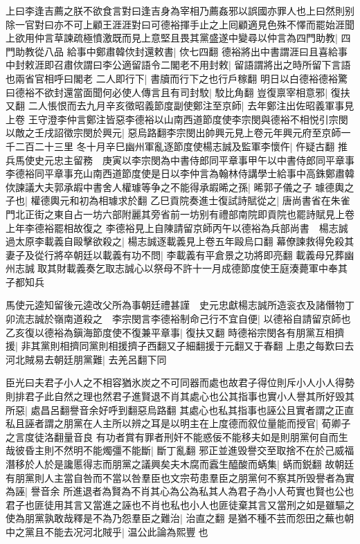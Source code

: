 上曰李逢吉薦之朕不欲食言對曰逢吉身為宰相乃薦姦邪以誤國亦罪人也上曰然則别除一官對曰亦不可上顧王涯涯對曰可德裕揮手止之上囘顧適見色殊不懌而罷始涯聞上欲用仲言草諫疏極憤激既而見上意堅且畏其黨盛遂中變尋以仲言為四門助教|{
	四門助教從八品}
給事中鄭肅韓佽封還敕書|{
	佽七四翻}
德裕將出中書謂涯曰且喜給事中封敕涯即召肅佽謂曰李公適留語令二閣老不用封敕|{
	留語謂將出之時所留下言語也兩省官相呼曰閣老}
二人即行下|{
	書牘而行下之也行戶稼翻}
明日以白德裕德裕驚曰德裕不欲封還當面聞何必使人傳言且有司封駮|{
	駮比角翻}
豈復禀宰相意邪|{
	復扶又翻}
二人悵恨而去九月辛亥徵昭義節度副使鄭注至京師|{
	去年鄭注出佐昭義軍事見上卷}
王守澄李仲言鄭注皆惡李德裕以山南西道節度使李宗閔與德裕不相悦引宗閔以敵之壬戌詔徵宗閔於興元|{
	惡烏路翻李宗閔出帥興元見上卷元年興元府至京師一千二百二十三里}
冬十月辛巳幽州軍亂逐節度使楊志誠及監軍李懷仵|{
	仵疑古翻}
推兵馬使史元忠主留務　庚寅以李宗閔為中書侍郎同平章事甲午以中書侍郎同平章事李德裕同平章事充山南西道節度使是日以李仲言為翰林侍講學士給事中高銖鄭肅韓佽諫議大夫郭承嘏中書舍人權璩等争之不能得承嘏晞之孫|{
	晞郭子儀之子}
璩德輿之子也|{
	權德輿元和初為相璩求於翻}
乙巳貢院奏進士復試詩賦從之|{
	唐尚書省在朱雀門北正街之東自占一坊六部附麗其旁省前一坊别有禮部南院即貢院也罷詩賦見上卷上年李德裕罷相故復之}
李德裕見上自陳請留京師丙午以德裕為兵部尚書　楊志誠過太原李載義自毆擊欲殺之|{
	楊志誠逐載義見上卷五年毆烏口翻}
幕僚諫救得免殺其妻子及從行將卒朝廷以載義有功不問|{
	李載義有平倉景之功將即亮翻}
載義母兄葬幽州志誠取其財載義奏乞取志誠心以祭母不許十一月成德節度使王庭湊薨軍中奉其子都知兵

馬使元逵知留後元逵改父所為事朝廷禮甚謹　史元忠獻楊志誠所造衮衣及諸僭物丁卯流志誠於嶺南道殺之　李宗閔言李德裕制命己行不宜自便|{
	以德裕自請留京師也}
乙亥復以德裕為鎭海節度使不復兼平章事|{
	復扶又翻}
時德裕宗閔各有朋黨互相擠援|{
	非其黨則相擠同黨則相援擠子西翻又子細翻援于元翻又于春翻}
上患之每歎曰去河北賊易去朝廷朋黨難|{
	去羌呂翻下同}


臣光曰夫君子小人之不相容猶氷炭之不可同器而處也故君子得位則斥小人小人得勢則排君子此自然之理也然君子進賢退不肖其處心也公其指事也實小人譽其所好毁其所惡|{
	處昌呂翻譽音余好呼到翻惡烏路翻}
其處心也私其指事也誣公且實者謂之正直私且誣者謂之朋黨在人主所以辨之耳是以明主在上度德而叙位量能而授官|{
	荀卿子之言度徒洛翻量音良}
有功者賞有罪者刑奸不能惑佞不能移夫如是則朋黨何自而生哉彼昏主則不然明不能燭彊不能斷|{
	斷丁亂翻}
邪正並進毁譽交至取捨不在於己威福潛移於人於是讒慝得志而朋黨之議興矣夫木腐而蠧生醯酸而蜹集|{
	蜹而鋭翻}
故朝廷有朋黨則人主當自咎而不當以咎羣臣也文宗苟患羣臣之朋黨何不察其所毁譽者為實為誣|{
	譽音余}
所進退者為賢為不肖其心為公為私其人為君子為小人苟實也賢也公也君子也匪徒用其言又當進之誣也不肖也私也小人也匪徒棄其言又當刑之如是雖驅之使為朋黨孰敢哉釋是不為乃怨羣臣之難治|{
	治直之翻}
是猶不種不芸而怨田之蕪也朝中之黨且不能去况河北賊乎|{
	温公此論為熙豐也}


